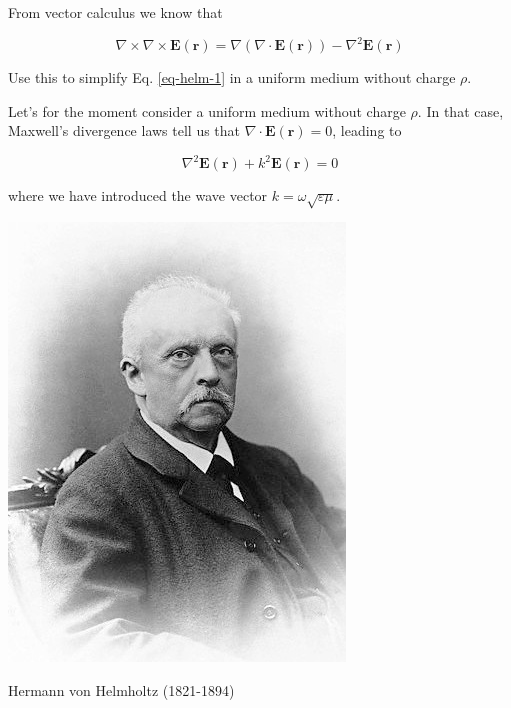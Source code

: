 From vector calculus we know that

\begin{equation}
\nabla \times \nabla \times {\mathbf E}({\mathbf r}) = \nabla (\nabla \cdot {\mathbf E}({\mathbf r})) - \nabla^2 {\mathbf E}({\mathbf r})
\end{equation}

\begin{cue}
Use this to simplify Eq. \ref{eq-helm-1} in a uniform medium without charge $\rho$. 
\end{cue}

Let's for the moment consider a uniform medium without charge $\rho$. In that case, Maxwell's divergence laws tell us that $\nabla \cdot {\mathbf E}({\mathbf r})=0$, leading to

\begin{equation}
\nabla^2 {\mathbf E}({\mathbf r}) + k^2 {\mathbf E}({\mathbf r}) = 0 \label{eq-helmholtz}
\end{equation}

where we have introduced the wave vector $k=\omega \sqrt{\varepsilon \mu}$.

\begin{marginfigure}[-0.0cm]
  \includegraphics{helmholtz/figures/Hermann_von_Helmholtz}
  \caption{Hermann von Helmholtz (1821-1894)}
\end{marginfigure}

